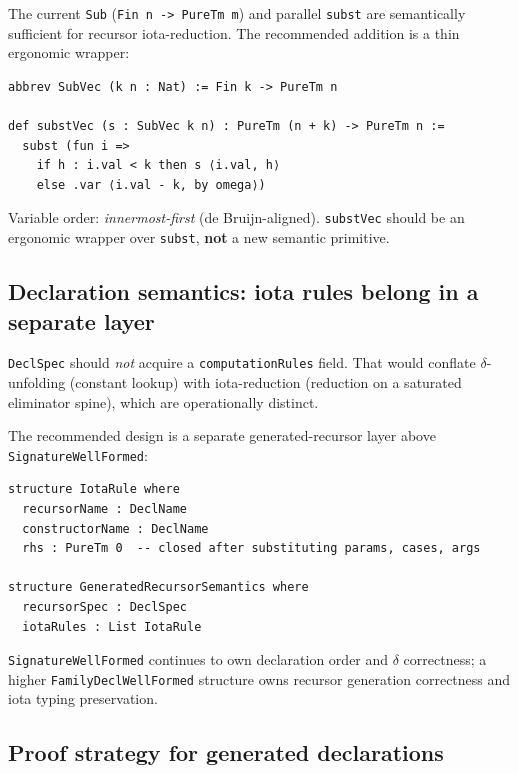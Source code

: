 \documentclass[11pt]{article}
\theoremstyle{remark}
\newcommand{\code}[1]{\texttt{#1}}
\newcommand{\leanref}[1]{\texttt{#1}}
\begin{document}
The current \leanref{Sub} (\code{Fin n -> PureTm m}) and parallel
\leanref{subst} are semantically sufficient for recursor iota-reduction.
The recommended addition is a thin ergonomic wrapper:
\begin{lstlisting}[language=Lean4]
abbrev SubVec (k n : Nat) := Fin k -> PureTm n

def substVec (s : SubVec k n) : PureTm (n + k) -> PureTm n :=
  subst (fun i =>
    if h : i.val < k then s ⟨i.val, h⟩
    else .var ⟨i.val - k, by omega⟩)
\end{lstlisting}
Variable order: \emph{innermost-first} (de Bruijn-aligned).
\leanref{substVec} should be an ergonomic wrapper over \leanref{subst},
\textbf{not} a new semantic primitive.

\subsection{Declaration semantics: iota rules belong in a separate layer}

\leanref{DeclSpec} should \emph{not} acquire a \code{computationRules} field.
That would conflate $\delta$-unfolding (constant lookup) with
iota-reduction (reduction on a saturated eliminator spine), which are
operationally distinct.

The recommended design is a separate generated-recursor layer above
\leanref{SignatureWellFormed}:
\begin{lstlisting}[language=Lean4]
structure IotaRule where
  recursorName : DeclName
  constructorName : DeclName
  rhs : PureTm 0  -- closed after substituting params, cases, args

structure GeneratedRecursorSemantics where
  recursorSpec : DeclSpec
  iotaRules : List IotaRule
\end{lstlisting}
\leanref{SignatureWellFormed} continues to own declaration order and $\delta$
correctness; a higher \leanref{FamilyDeclWellFormed} structure owns
recursor generation correctness and iota typing preservation.

\subsection{Proof strategy for generated declarations}
\end{document}
